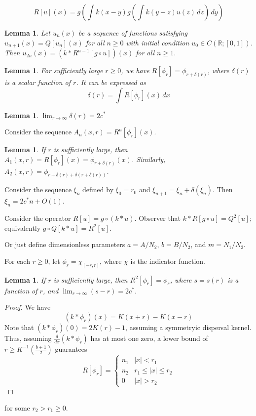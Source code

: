 \documentclass[11pt]{article}
\newtheorem{lem}[thm]{Lemma}
\theoremstyle{definition}
\numberwithin{equation}{section}
\numberwithin{thm}{section}
\renewcommand{\b}{b}
\begin{document}
\begin{equation}
R[u](x) = g\left( \int k(x-y) g\left( \int k(y-z) u(z) \, dz \right) \, dy \right)
\end{equation}

\begin{lem}
Let $u_n(x)$ be a sequence of functions satisfying $u_{n+1}(x)=Q[u_n](x)$ for all $n \geq 0$ with initial condition $u_0 \in C(\mathbb R; [0,1])$. Then $u_{2n}(x) = (k*R^{n-1}[g\circ u])(x)$ for all $n\geq1 $.
\end{lem}

\begin{lem}
For sufficiently large $r \geq 0$, we have $R[\phi_r] = \phi_{r+\delta(r)}$, where $\delta(r)$ is a scalar function of $r$. It can be expressed as
$$ \delta(r) = \int R[\phi_r](x)  \, dx $$
\end{lem}

\begin{lem}
$\lim_{r\to\infty} \delta(r) = 2c^* $
\end{lem}

Consider the sequence $A_n(x,r)=R^n[\phi_r](x)$. 

\begin{lem}
If $r$ is sufficiently large, then $A_1(x,r)=R[\phi_r](x) = \phi_{r+\delta(r)}(x)$. Similarly, $A_2(x,r) = \phi_{r+\delta(r)+\delta(r+\delta(r))}$.
\end{lem}

Consider the sequence $\xi_n$ defined by $\xi_0 = r_0$ and $\xi_{n+1} = \xi_n + \delta(\xi_n)$. Then $\xi_n = 2c^*n + O(1)$. 

Consider the operator $R[u] = g \circ (k * u)$. Observer that $k*R[g \circ u] = Q^2 [u]$; equivalently $g \circ Q[k*u] = R^2[u]$.

Or just define dimensionless parameters $a=A/N_2$, $b=B/N_2$, and $m = N_1/N_2$.

For each $r \geq 0$, let $\phi_r = \chi_{[-r,r]}$, where $\chi$ is the indicator function.

\begin{lem}
If $r$ is sufficiently large, then $R^2[\phi_r] = \phi_s$, where $s=s(r)$ is a function of $r$, and $\lim_{r\to\infty}(s-r) = 2c^*$.
\end{lem}

\begin{proof}
We have
$$ (k*\phi_r)(x) = K(x+r) - K(x-r) $$
Note that $(k*\phi_r)(0) = 2K(r)-1$, assuming a symmetryic dispersal kernel. Thus, assuming $\frac{d}{dx}(k*\phi_r)$ has at most one zero, a lower bound of $r \geq K^{-1}\left(\frac{\b+1}{2}\right)$ guarantees 
$$ R[\phi_r] = \begin{cases}
n_1 & |x| < r_1 \\
n_2 & r_1 \leq |x| \leq r_2 \\
0 & |x| > r_2
\end{cases} $$
\end{proof}
for some $r_2 > r_1 \geq 0$. 
\end{document}
